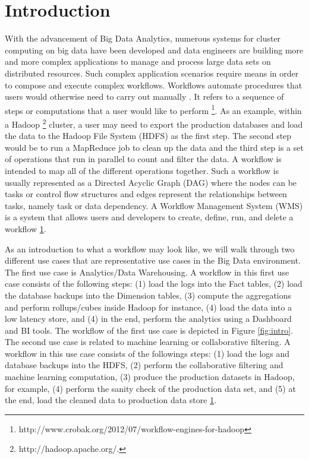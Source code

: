 \chapter{Introduction}
With the advancement of Big Data Analytics, numerous systems for cluster computing on big data have been developed \cite{zaharia2012resilient,battre2010nephele,thusoo2010hive,dean2008mapreduce,yu2008dryadlinq,olston2008pig} and data engineers are building more and more complex applications to manage and process large data sets on distributed resources. Such complex application scenarios require means in order to compose and execute complex workflows. Workflows automate procedures that users would otherwise need to carry out manually \cite{deelman2009workflows}. It refers to a sequence of steps or computations that a user would like to perform 
\footnote{\label{crobak}http://www.crobak.org/2012/07/workflow-engines-for-hadoop}. As an example, within a Hadoop \footnote{\label{hadoop}http://hadoop.apache.org/.} cluster, a user may need to export the production databases and load the data to the Hadoop File System (HDFS) as the first step. The second step would be to run a MapReduce job to clean up the data and the third step is a set of operations that run in parallel to count and filter the data. A workflow is intended to map all of the different operations together. Such a workflow is usually represented as a Directed Acyclic Graph (DAG) where the nodes can be tasks or control flow structures and edges represent the relationships between tasks, namely task or data dependency. A Workflow Management System (WMS) is a system that allows users and developers to create, define, run, and delete a workflow \cref{crobak}. 
	
As an introduction to what a workflow may look like, we will walk through two different use cases that are representative use cases in the Big Data environment. The first use case is Analytics/Data Warehousing. A workflow in this first use case consists of the following steps: (1) load the logs into the Fact tables, (2) load the database backups into the Dimension tables, (3) compute the aggregations and perform rollups/cubes inside Hadoop for instance, (4) load the data into a low latency store, and (4) in the end, perform the analytics using a Dashboard and BI tools. The workflow of the first use case is depicted in Figure \ref{fig:intro}. The second use case is related to machine learning or collaborative filtering. A workflow in this use case consists of the followings steps: (1) load the logs and database backups into the HDFS, (2) perform the collaborative filtering and machine learning computation, (3) produce the production datasets in Hadoop, for example, (4) perform the sanity check of the production data set, and (5) at the end, load the cleaned data to production data store \cref{crobak}.

